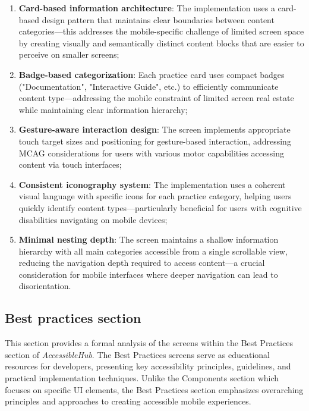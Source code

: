 \begin{enumerate}
    \item \textbf{Card-based information architecture}: The implementation uses a card-based design pattern that maintains clear boundaries between content categories—this addresses the mobile-specific challenge of limited screen space by creating visually and semantically distinct content blocks that are easier to perceive on smaller screens;
    
    \item \textbf{Badge-based categorization}: Each practice card uses compact badges ("Documentation", "Interactive Guide", etc.) to efficiently communicate content type—addressing the mobile constraint of limited screen real estate while maintaining clear information hierarchy;
    
    \item \textbf{Gesture-aware interaction design}: The screen implements appropriate touch target sizes and positioning for gesture-based interaction, addressing MCAG considerations for users with various motor capabilities accessing content via touch interfaces;
    
    \item \textbf{Consistent iconography system}: The implementation uses a coherent visual language with specific icons for each practice category, helping users quickly identify content types—particularly beneficial for users with cognitive disabilities navigating on mobile devices;
    
    \item \textbf{Minimal nesting depth}: The screen maintains a shallow information hierarchy with all main categories accessible from a single scrollable view, reducing the navigation depth required to access content—a crucial consideration for mobile interfaces where deeper navigation can lead to disorientation.
\end{enumerate}

\subsection{Best practices section}
\label{subsec:best-practices-section}

This section provides a formal analysis of the screens within the Best Practices section of \textit{AccessibleHub}. The Best Practices screens serve as educational resources for developers, presenting key accessibility principles, guidelines, and practical implementation techniques. Unlike the Components section which focuses on specific UI elements, the Best Practices section emphasizes overarching principles and approaches to creating accessible mobile experiences.

